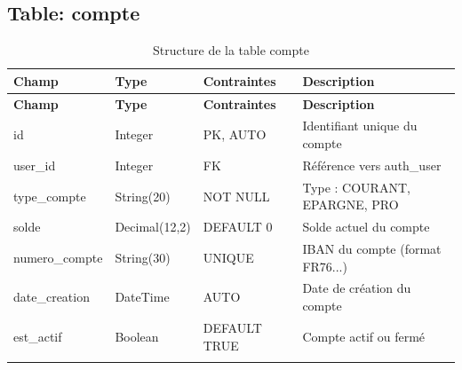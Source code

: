 \documentclass[12pt,a4paper]{report}
\begin{document}
\subsection{Table: compte}
\begin{longtable}{|p{3.5cm}|p{2.5cm}|p{2cm}|p{6cm}|}
\hline
\rowcolor{banquiseblue!30}
\textbf{Champ} & \textbf{Type} & \textbf{Contraintes} & \textbf{Description} \\
\hline
\endfirsthead
\hline
\rowcolor{banquiseblue!30}
\textbf{Champ} & \textbf{Type} & \textbf{Contraintes} & \textbf{Description} \\
\hline
\endhead

id & Integer & PK, AUTO & Identifiant unique du compte \\
\hline
user\_id & Integer & FK & Référence vers auth\_user \\
\hline
type\_compte & String(20) & NOT NULL & Type : COURANT, EPARGNE, PRO \\
\hline
solde & Decimal(12,2) & DEFAULT 0 & Solde actuel du compte \\
\hline
numero\_compte & String(30) & UNIQUE & IBAN du compte (format FR76...) \\
\hline
date\_creation & DateTime & AUTO & Date de création du compte \\
\hline
est\_actif & Boolean & DEFAULT TRUE & Compte actif ou fermé \\
\hline

\caption{Structure de la table compte}
\end{longtable}
\end{document}
